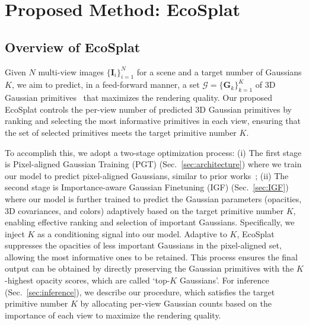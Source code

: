\section{Proposed Method: EcoSplat}
\label{sec:proposed_method}

\subsection{Overview of EcoSplat}
Given $N$ multi-view images $\{\bm{I}_i\}_{i=1}^{N}$ for a scene and a target number of Gaussians $K$, we aim to predict, in a feed-forward manner, a set $\mathcal{G}=\{\bm{G}_k\}_{k=1}^{K}$ of 3D Gaussian primitives~\cite{kerbl20233d} that maximizes the rendering quality.
Our proposed {EcoSplat} controls the per-view number of predicted 3D Gaussian primitives by ranking and selecting the most informative primitives in each view, ensuring that the set of selected primitives meets the target primitive number $K$.

To accomplish this, we adopt a two-stage optimization process: (i) The first stage is Pixel-aligned Gaussian Training (PGT) (Sec.~\ref{sec:architecture}) where we train our model to predict pixel-aligned Gaussians, similar to prior works~\cite{charatan2024pixelsplat, chen2024mvsplat}; (ii) The second stage is Importance-aware Gaussian Finetuning (IGF) (Sec.~\ref{sec:IGF}) where our model is further trained to predict the Gaussian parameters (opacities, 3D covariances, and colors) adaptively based on the target primitive number $K$, enabling effective ranking and selection of important Gaussians.
Specifically, we inject $K$ as a conditioning signal into our model. Adaptive to $K$, EcoSplat suppresses the opacities of less important Gaussians in the pixel-aligned set, allowing the most informative ones to be retained. This process ensures the final output can be obtained by directly preserving the Gaussian primitives with the $K$-highest opacity scores, which are called `top-$K$ Gaussians'. For inference (Sec.~\ref{sec:inference}), we describe our procedure, which satisfies the target primitive number $K$ by allocating per-view Gaussian counts based on the importance of each view to maximize the rendering quality.









